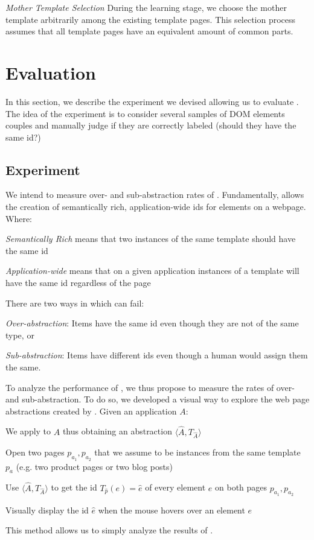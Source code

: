 \emph{Mother Template Selection}
During the learning stage, we choose the mother template arbitrarily among the existing template pages.
This selection process assumes that all template pages have an equivalent amount of common parts.

\section{Evaluation}\label{appstract:sec:evaluation}
In this section, we describe the experiment we devised allowing us to evaluate \appstract{}.
The idea of the experiment is to consider several samples of DOM elements couples and manually judge if they are correctly labeled (should they have the same id?)

\subsection{Experiment}
We intend to measure over- and sub-abstraction rates of \appstract{}. 
Fundamentally, \appstract{} allows the creation of semantically rich, application-wide ids for elements on a webpage.
Where:
\begin{compactitem}
  \item \textit{Semantically Rich} means that two instances of the same template should have the same id
  \item \textit{Application-wide} means that on a given application instances of a template will have the same id regardless of the page
\end{compactitem}
There are two ways in which \appstract{} can fail:
\begin{compactitem}
  \item \emph{Over-abstraction}: Items have the same id even though they are not of the same type, or
  \item \emph{Sub-abstraction}: Items have different ids even though a human would assign them the same.
\end{compactitem}
To analyze the performance of \appstract{}, we thus propose to measure the rates of over- and sub-abstraction.
To do so, we developed a visual way to explore the web page abstractions created by \appstract{}.
Given an application $A$:
\begin{compactitem}
  \item We apply \appstract{} to $A$ thus obtaining an abstraction $\langle \hat{A}, T_{\hat{A}} \rangle$
  \item Open two pages $p_{a_1}, p_{a_2}$ that we assume to be instances from the same template $p_a$ (e.g. two product pages or two blog posts)
  \item Use $\langle \hat{A}, T_{\hat{A}} \rangle$ to get the id $T_{\hat{p}}(e) = \hat{e}$ of every element $e$ on both pages $p_{a_1}, p_{a_2}$
  \item Visually display the id $\hat{e}$ when the mouse hovers over an element $e$
\end{compactitem}
This method allows us to simply analyze the results of \appstract{}.

